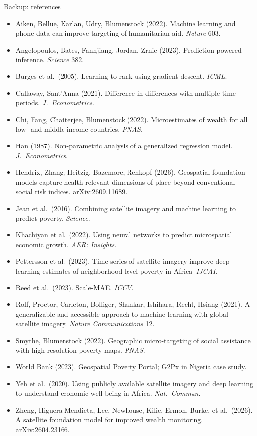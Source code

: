 \documentclass[10pt,aspectratio=169]{beamer}
\begin{document}
\begin{frame}{Backup: references}
\tiny
\begin{itemize}
\item Aiken, Bellue, Karlan, Udry, Blumenstock (2022). Machine learning and phone data can improve targeting of humanitarian aid. \emph{Nature} 603.
\item Angelopoulos, Bates, Fannjiang, Jordan, Zrnic (2023). Prediction-powered inference. \emph{Science} 382.
\item Burges et al.\ (2005). Learning to rank using gradient descent. \emph{ICML}.
\item Callaway, Sant'Anna (2021). Difference-in-differences with multiple time periods. \emph{J.\ Econometrics}.
\item Chi, Fang, Chatterjee, Blumenstock (2022). Microestimates of wealth for all low- and middle-income countries. \emph{PNAS}.
\item Han (1987). Non-parametric analysis of a generalized regression model. \emph{J.\ Econometrics}.
\item Hendrix, Zhang, Heitzig, Bazemore, Rehkopf (2026). Geospatial foundation models capture health-relevant dimensions of place beyond conventional social risk indices. arXiv:2609.11689.
\item Jean et al.\ (2016). Combining satellite imagery and machine learning to predict poverty. \emph{Science}.
\item Khachiyan et al.\ (2022). Using neural networks to predict microspatial economic growth. \emph{AER: Insights}.
\item Pettersson et al.\ (2023). Time series of satellite imagery improve deep learning estimates of neighborhood-level poverty in Africa. \emph{IJCAI}.
\item Reed et al.\ (2023). Scale-MAE. \emph{ICCV}.
\item Rolf, Proctor, Carleton, Bolliger, Shankar, Ishihara, Recht, Hsiang (2021). A generalizable and accessible approach to machine learning with global satellite imagery. \emph{Nature Communications} 12.
\item Smythe, Blumenstock (2022). Geographic micro-targeting of social assistance with high-resolution poverty maps. \emph{PNAS}.
\item World Bank (2023). Geospatial Poverty Portal; G2Px in Nigeria case study.
\item Yeh et al.\ (2020). Using publicly available satellite imagery and deep learning to understand economic well-being in Africa. \emph{Nat.\ Commun.}
\item Zheng, Higuera-Mendieta, Lee, Newhouse, Kilic, Ermon, Burke, et al.\ (2026). A satellite foundation model for improved wealth monitoring. arXiv:2604.23166.
\end{itemize}
\end{frame}
\end{document}
